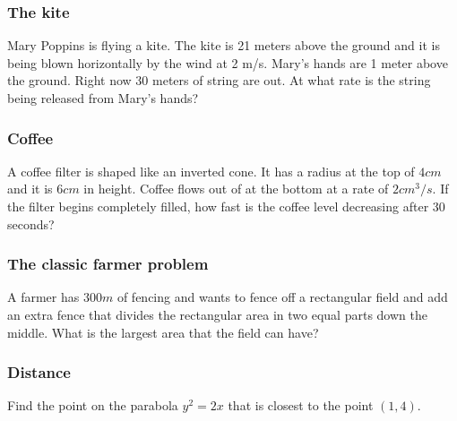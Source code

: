 \documentclass[14pt]{beamer}
\begin{document}
	\begin{frame}[t]
		\frametitle{The kite}

		Mary Poppins is flying a kite. The kite is 21 meters above the ground and it
		is being blown horizontally by the wind at 2 m/s. Mary's hands are 1 meter
		above the ground. Right now 30 meters of string are out. At what rate is the
		string being released from Mary's hands?
	\end{frame}

	\begin{frame}[t]
		\frametitle{Coffee}

		A coffee filter is shaped like an inverted cone. It has a radius at the top of
		$4cm$ and it is $6cm$ in height. Coffee flows out of at the bottom at a rate
		of $2cm^{3}/s$. If the filter begins completely filled, how fast is the
		coffee level decreasing after 30 seconds?
	\end{frame}





	\begin{frame}[t]
		\frametitle{The classic farmer problem}

		A farmer has $300m$ of fencing and wants to fence off a rectangular field
		and add an extra fence that divides the rectangular area in two equal parts
		down the middle. What is the largest area that the field can have?
	\end{frame}


	\begin{frame}[t]
		\frametitle{Distance}

		Find the point on the parabola $y^{2}=2x$ that is closest to the point
		$(1,4)$.
	\end{frame}
\end{document}
